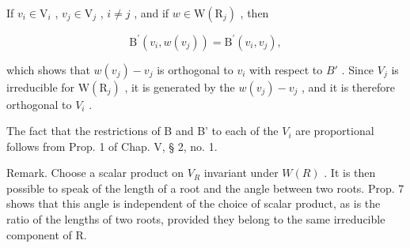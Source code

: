 If \(v_{i} \in \mathrm{V}_{i}\) , \(v_{j} \in \mathrm{V}_{j}\) , \(i \neq j\) , and if \(w \in \mathrm{W}(\mathrm{R}_j)\) , then

\[
\mathrm{B} ^ {\prime} (v _ {i}, w (v _ {j})) = \mathrm{B} ^ {\prime} (v _ {i}, v _ {j}),
\]

which shows that \(w(v_{j}) - v_{j}\) is orthogonal to \(v_{i}\) with respect to \(B'\) . Since \(V_{j}\) is irreducible for \(\mathrm{W}(\mathrm{R}_{j})\) , it is generated by the \(w(v_{j}) - v_{j}\) , and it is therefore orthogonal to \(V_{i}\) .

The fact that the restrictions of B and B' to each of the \(V_{i}\) are proportional follows from Prop. 1 of Chap. V, § 2, no. 1.

Remark. Choose a scalar product on \(V_{R}\) invariant under \(W(R)\) . It is then possible to speak of the length of a root and the angle between two roots. Prop. 7 shows that this angle is independent of the choice of scalar product, as is the ratio of the lengths of two roots, provided they belong to the same irreducible component of R.


